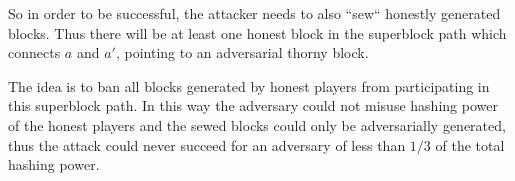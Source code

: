 So in order to be successful, the attacker needs to also ``sew`` honestly generated
blocks. Thus there will be at least one honest block in the superblock path which
connects $a$ and $a'$, pointing to an adversarial thorny block.

The idea is to ban all blocks generated by honest players from participating in
this superblock path. In this way the adversary could not misuse hashing power of
the honest players and the sewed blocks could only be adversarially generated,
thus the attack could never succeed for an adversary of less than $1/3$ of the
total hashing power.
